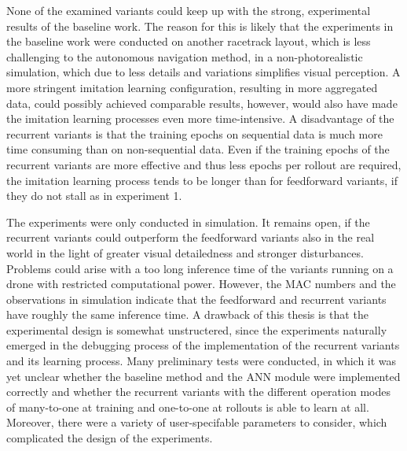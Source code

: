 None of the examined variants could keep up with the strong, experimental results of the baseline work.
The reason for this is likely that the experiments in the baseline work 
were conducted on another racetrack layout, 
which is less challenging to the autonomous navigation method,
in a non-photorealistic simulation,
which due to less details and variations simplifies visual perception.
A more stringent imitation learning configuration,
resulting in more aggregated data,
could possibly achieved comparable results,
however, would also have made the imitation learning processes even more time-intensive.
A disadvantage of the recurrent variants is that the training epochs on sequential data
is much more time consuming than on non-sequential data.
Even if the training epochs of the recurrent variants are more effective
and thus less epochs per rollout are required,
the imitation learning process tends to be longer than for feedforward variants,
if they do not stall as in experiment 1.

The experiments were only conducted in simulation.
It remains open, if the recurrent variants could outperform the feedforward variants also in the real world
in the light of greater visual detailedness and stronger disturbances.
Problems could arise with a too long inference time of the variants running
on a drone with restricted computational power. However, the MAC numbers and the observations in simulation
indicate that the feedforward and recurrent variants have roughly the same inference time.
A drawback of this thesis is that the experimental design is somewhat unstructered,
since the experiments naturally emerged in the debugging process of the
implementation of the recurrent variants and its learning process.
Many preliminary tests were conducted,
in which it was yet unclear whether the baseline method and the ANN module
were implemented correctly
and whether the recurrent variants
with the different operation modes of many-to-one at training 
and one-to-one at rollouts is able to learn at all.
Moreover, there were a variety of user-specifable parameters to consider,
which complicated the design of the experiments.



